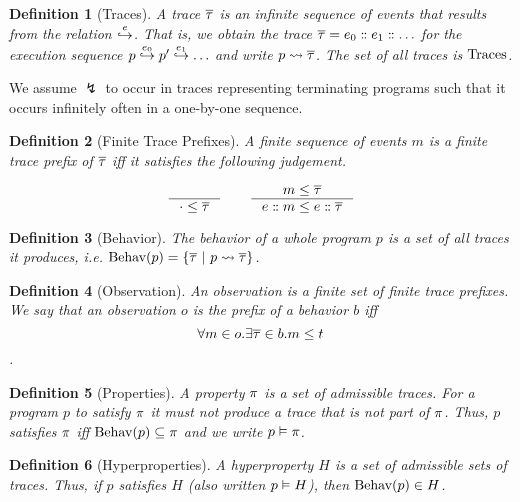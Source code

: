 \documentclass[a4paper,names,dvipsnames]{article}
\newtheorem{definition}{Definition}
\begin{document}
\begin{definition}[Traces]
  A trace $\overline{\tau}$ is an infinite sequence of events that results from the relation $\stackrel{e}{\hookrightarrow}$.
  That is, we obtain the trace $\overline{\tau}={{e_{0}}:{\kern-6.25pt}:{{{e_{1}}:{\kern-6.25pt}:{\dots}}}}$ for the execution sequence ${p}\stackrel{e_{0}}{\hookrightarrow}{{p'}\stackrel{e_{1}}{\hookrightarrow}{\dots}}$ and write ${p}\leadsto{\overline{\tau}}$.
  The set of all traces is $\text{Traces}$.
\end{definition}
\noindent
We assume $\lightning$ to occur in traces representing terminating programs such that it occurs infinitely often in a one-by-one sequence.

\begin{definition}[Finite Trace Prefixes]
  A finite sequence of events $m$ is a finite trace prefix of $\overline{\tau}$ iff it satisfies the following judgement.

  $$
    \inference{}{\cdot\le\trace}\hspace{2em}\inference{m\le\trace}{\seqcons{e}{m}\le \seqcons{e}{\trace}}
  $$
\end{definition}

\begin{definition}[Behavior]
  The behavior of a whole program $p$ is a set of all traces it produces, i.e. $\behav{p}=\{\trace\ |\ \mktrace{p}{\trace}\}$.
\end{definition}

\begin{definition}[Observation]
  An observation is a finite set of finite trace prefixes.
  We say that an observation $o$ is the prefix of a behavior $b$ iff $$\forall m\in o.\exists \overline{\tau}\in b.m\le t$$.
\end{definition}

\begin{definition}[Properties]
  A property $\pi$ is a set of admissible traces. For a program $p$ to satisfy $\pi$ it must not produce a trace that is not part of $\pi$. Thus, $p$ satisfies $\pi$ iff $\text{Behav}({p})\subseteq\pi$ and we write ${p}\vDash{\pi}$.
\end{definition}

\begin{definition}[Hyperproperties]
  A hyperproperty $H$ is a set of admissible sets of traces. Thus, if $p$ satisfies $H$ (also written ${p}\vDash{H}$), then $\text{Behav}({p})\in H$.
\end{definition}
\end{document}
